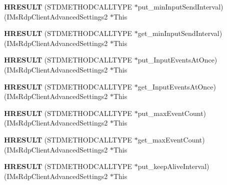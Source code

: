 \begin{DoxyCompactItemize}
{\bfseries H\+R\+E\+S\+U\+LT} (S\+T\+D\+M\+E\+T\+H\+O\+D\+C\+A\+L\+L\+T\+Y\+PE $\ast$put\+\_\+min\+Input\+Send\+Interval)(I\+Ms\+Rdp\+Client\+Advanced\+Settings2 $\ast$This
\item 
\mbox{\label{struct_i_ms_rdp_client_advanced_settings2_vtbl_a7d9424ffac618ca10dbeee918f6156a7}} 
{\bfseries H\+R\+E\+S\+U\+LT} (S\+T\+D\+M\+E\+T\+H\+O\+D\+C\+A\+L\+L\+T\+Y\+PE $\ast$get\+\_\+min\+Input\+Send\+Interval)(I\+Ms\+Rdp\+Client\+Advanced\+Settings2 $\ast$This
\item 
\mbox{\label{struct_i_ms_rdp_client_advanced_settings2_vtbl_af9783b6f925a196494e4a67a07e513b9}} 
{\bfseries H\+R\+E\+S\+U\+LT} (S\+T\+D\+M\+E\+T\+H\+O\+D\+C\+A\+L\+L\+T\+Y\+PE $\ast$put\+\_\+\+Input\+Events\+At\+Once)(I\+Ms\+Rdp\+Client\+Advanced\+Settings2 $\ast$This
\item 
\mbox{\label{struct_i_ms_rdp_client_advanced_settings2_vtbl_a47add827a5df7384a46058d291a38156}} 
{\bfseries H\+R\+E\+S\+U\+LT} (S\+T\+D\+M\+E\+T\+H\+O\+D\+C\+A\+L\+L\+T\+Y\+PE $\ast$get\+\_\+\+Input\+Events\+At\+Once)(I\+Ms\+Rdp\+Client\+Advanced\+Settings2 $\ast$This
\item 
\mbox{\label{struct_i_ms_rdp_client_advanced_settings2_vtbl_a862f97df8e59e313333d201a37cdea06}} 
{\bfseries H\+R\+E\+S\+U\+LT} (S\+T\+D\+M\+E\+T\+H\+O\+D\+C\+A\+L\+L\+T\+Y\+PE $\ast$put\+\_\+max\+Event\+Count)(I\+Ms\+Rdp\+Client\+Advanced\+Settings2 $\ast$This
\item 
\mbox{\label{struct_i_ms_rdp_client_advanced_settings2_vtbl_ac2a80a066881e0429075c6ebd6583f3e}} 
{\bfseries H\+R\+E\+S\+U\+LT} (S\+T\+D\+M\+E\+T\+H\+O\+D\+C\+A\+L\+L\+T\+Y\+PE $\ast$get\+\_\+max\+Event\+Count)(I\+Ms\+Rdp\+Client\+Advanced\+Settings2 $\ast$This
\item 
\mbox{\label{struct_i_ms_rdp_client_advanced_settings2_vtbl_a7dde2258d13cdb3787b6fff90aa29f47}} 
{\bfseries H\+R\+E\+S\+U\+LT} (S\+T\+D\+M\+E\+T\+H\+O\+D\+C\+A\+L\+L\+T\+Y\+PE $\ast$put\+\_\+keep\+Alive\+Interval)(I\+Ms\+Rdp\+Client\+Advanced\+Settings2 $\ast$This

\end{DoxyCompactItemize}
